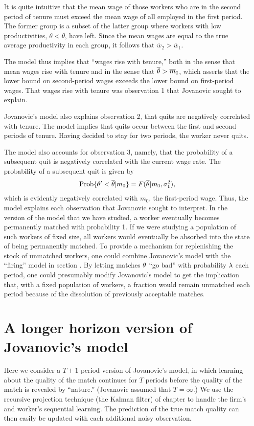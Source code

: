 It is quite intuitive that the mean wage of those workers who are in the
second period of tenure must exceed the mean wage of all employed in the
first period. The former group is a subset of the latter group where
workers with low productivities, $\theta<\overline \theta$, have left.
Since the mean wages are equal to the true average productivity in
each group, it follows that $\overline w_2 > \overline w_1$.

The model thus implies that ``wages rise with tenure,'' both in the sense that
mean wages rise with tenure and in the sense that $\overline{{\theta}}>\overline m_0$, which
asserts that the lower bound on second-period wages exceeds the lower bound on
first-period wages.  That wages rise with tenure was observation 1 that
Jovanovic sought to explain.

Jovanovic's model also explains observation 2, that quits are negatively
correlated with tenure.  The model implies that quits occur between the first
and second periods of tenure.  Having decided to stay for two periods, the
worker never quits.

The model also accounts for observation 3, namely, that the probability of a
subsequent quit is negatively correlated with the current wage rate.  The
probability of a subsequent quit is given by
$${\rm Prob}\{{\theta}'<\overline{{\theta}}|m_0\} =
F(\overline {{\theta}}|m_0,\sigma_1^2),$$
which is evidently negatively correlated with $m_0$, the first-period wage.
Thus, the model explains each observation that Jovanovic sought to interpret.
In the version of the model that we have studied, a worker eventually becomes
permanently matched with probability 1.  If we were studying a population of
such workers of fixed size, all workers would eventually be absorbed into the
state of being permanently matched.  To provide a mechanism for replenishing
the stock of unmatched workers, one could combine Jovanovic's model
with the ``firing'' model in section .
  By letting matches ${\theta}$
``go bad'' with probability $\lambda$ each period, one could presumably modify
Jovanovic's model to get the implication that, with a fixed population of
workers, a fraction would remain unmatched each period because of the
dissolution of previously acceptable matches.

\section{A longer horizon version of Jovanovic's model}

Here we consider a $T+1$ period
version of Jovanovic's model, in which learning about the quality of the match
continues for $T$ periods before the quality of the match is revealed by
``nature.''  (Jovanovic assumed that $T = \infty$.)  We use the
recursive projection technique (the Kalman filter)
 of chapter  to handle the firm's and
worker's sequential learning. The prediction of
the true match quality can then easily be updated with each additional
noisy observation.

